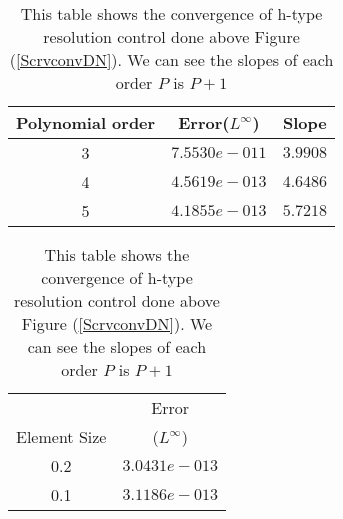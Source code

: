 \begin{table}[h]
\centering \caption{\label{hconv2t} This table shows the convergence of h-type resolution control done above Figure (\ref{ScrvconvDN}). We can see the slopes of each order $P$ is $P+1$ }
\begin{tabular}{|c|c|c|} \hline
    Polynomial order&Error($L^{\infty}$)&Slope   \\ \hline \hline
    3&$7.5530e-011$ &$3.9908$ \\ \hline
    4&$4.5619e-013$ &$4.6486$ \\ \hline
    5&$4.1855e-013$ &$5.7218$ \\ \hline
\end{tabular}
\hspace{.5in}
\begin{tabular}{|c|c|} \hline
    &\multicolumn{1}{|c|}{Error}\\
    \raisebox{0.5\baselineskip}%
    {Element Size}&($L^{\infty}$) \\ \hline \hline
    0.2&$3.0431e-013$  \\ \hline
    0.1&$3.1186e-013$ \\ \hline
\end{tabular}
\end{table}
